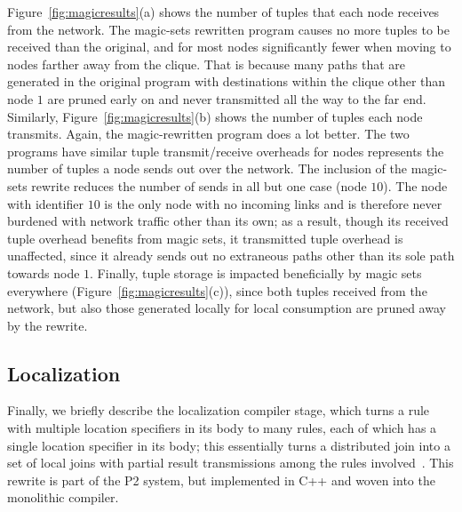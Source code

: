 Figure~\ref{fig:magicresults}(a) shows the number of tuples that each node receives from
the network. The magic-sets rewritten program causes no more tuples to
be received than the original, and for most nodes significantly fewer
when moving to nodes farther away from the clique. That is because many
paths that are generated in the original program with destinations
within the clique other than node $1$ are pruned early on and never
transmitted all the way to the far end.    Similarly,
Figure~\ref{fig:magicresults}(b) shows the number of tuples each node transmits.
Again, the magic-rewritten program does a lot better.  The two programs
have similar tuple transmit/receive overheads for nodes represents the number of tuples a node sends out
over the network. The inclusion of the magic-sets rewrite reduces the number of sends
in all but one case (node $10$). The node with identifier $10$ is the only node with 
no incoming links and 
is therefore never burdened with network traffic other than its
own; as a result, though its received tuple overhead benefits from magic
sets, it transmitted tuple overhead is unaffected, since it already
sends out no extraneous paths other than its sole path towards node $1$.
Finally, tuple storage is impacted beneficially by magic sets everywhere
(Figure~\ref{fig:magicresults}(c)), since
both  tuples received from the network, but also those
generated locally for local consumption are pruned away by the rewrite.






\subsection{Localization}
\label{sec:localization}

Finally, we briefly describe the localization compiler stage, which turns
a rule with  multiple
location specifiers in its body to many rules, each of which has a
single location specifier in its body; this essentially turns a
distributed join into a set of local joins with partial result
transmissions among the rules involved~\cite{loo-sigmod06}. This rewrite
is part of the P2
system, but implemented in C++ and woven into the monolithic compiler.

